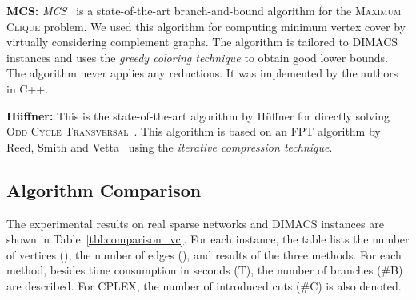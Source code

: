 \documentclass[11pt]{article}
\newcommand{\OCT}{\textsc{Odd Cycle Transversal}\xspace}
\newcommand{\myparagraph}[1]{\vspace{1em}\noindent\textbf{#1:}}
\begin{document}
\myparagraph{MCS} \emph{MCS}~\cite{clique/mcs_walcom10} is a state-of-the-art branch-and-bound algorithm
for the \textsc{Maximum Clique} problem.
We used this algorithm for computing minimum vertex cover by virtually considering complement graphs.
The algorithm is tailored to DIMACS instances
and uses the \emph{greedy coloring technique} to obtain good lower bounds.
The algorithm never applies any reductions.
It was implemented by the authors in C++.

\myparagraph{H{\"u}ffner}
This is the state-of-the-art algorithm by H{\"u}ffner
for directly solving \OCT~\cite{oct/huffner09}.
This algorithm is based on an FPT algorithm by Reed, Smith and Vetta~\cite{oct/reed2004}
using the \emph{iterative compression technique}.




\subsection{Algorithm Comparison}
The experimental results on real sparse networks and DIMACS instances
are shown in Table~\ref{tbl:comparison_vc}.
For each instance,
the table lists the number of vertices (),
the number of edges (),
and results of the three methods.
For each method,
besides time consumption in seconds (T),
the number of branches (\#B) are described.
For CPLEX, the number of introduced cuts (\#C) is also denoted.
\end{document}
